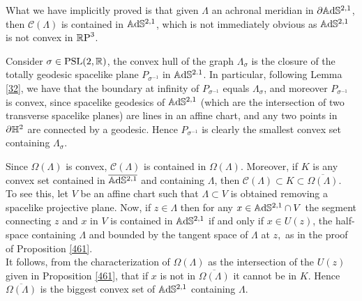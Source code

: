 What we have implicitly proved is that given $\Lambda$ an achronal meridian in $\partial\mathbb{A}\mathrm{d}\mathbb{S}^{2,1}$, then $\mathcal{C}(\Lambda)$ is contained in $\mathbb{A}\mathrm{d}\mathbb{S}^{2,1}$, which is not immediately obvious as $\mathbb{A}\mathrm{d}\mathbb{S}^{2,1}$ is not convex in $\mathbb{R}\text{P}^3$. \\

\begin{example}\label{43}
    Consider $\sigma\in\text{PSL}(2,\mathbb{R})$, the convex hull of the graph $\Lambda_\sigma$ is the closure of the totally geodesic spacelike plane $P_{\sigma^{-1}}$ in $\mathbb{A}\mathrm{d}\mathbb{S}^{2.1}$. In particular, following Lemma \ref{32}, we have that the boundary at infinity of $P_{\sigma^{-1}}$ equals $\Lambda_\sigma$, and moreover $P_{\sigma^{-1}}$ is convex, since spacelike geodesics of $\mathbb{A}\mathrm{d}\mathbb{S}^{2,1}$ (which are the intersection of two transverse spacelike planes) are lines in an affine chart, and any two points in $\partial\mathbb{H}^2$ are connected by a geodesic. Hence $P_{\sigma^{-1}}$ is clearly the smallest convex set containing $\Lambda_\sigma$.  
\end{example}

\begin{observation} Since $\Omega(\Lambda)$ is convex, $\mathcal{C}(\Lambda)$ is contained in $\Omega(\Lambda)$. Moreover, if $K$ is any convex set contained in $\overline{\mathbb{A}\mathrm{d}\mathbb{S}^{2,1}}$ and containing $\Lambda$, then $\mathcal{C}(\Lambda)\subset K\subset \overline{\Omega(\Lambda)}.$\\
    To see this, let $V$ be an affine chart such that $\Lambda\subset V$ is obtained removing a spacelike projective plane. Now, if $z\in \Lambda$ then for any $x\in\mathbb{A}\mathrm{d}\mathbb{S}^{2,1}\cap V$ the segment connecting $z$ and $x$ in $V$ is contained in $\mathbb{A}\mathrm{d}\mathbb{S}^{2,1}$ if and only if $x\in U(z)$, the half-space containing $\Lambda$ and bounded by the tangent space of $\Lambda$ at $z,$ as in the proof of Proposition \ref{461}. \\
    It follows, from the characterization of $\Omega(\Lambda)$ as the intersection of the $U(z)$ given in Proposition \ref{461}, that if $x$ is not in $\overline{\Omega(\Lambda)}$ it cannot be in $K$. Hence $\overline{\Omega(\Lambda)}$ is the biggest convex set of $\mathbb{A}\mathrm{d}\mathbb{S}^{2,1}$ containing $\Lambda$.
\end{observation}

